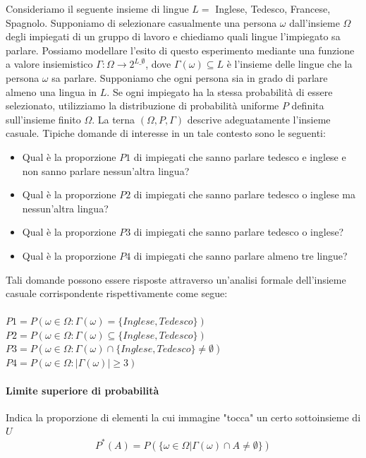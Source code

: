 Consideriamo il seguente insieme di lingue $L =$ {Inglese, Tedesco, Francese, Spagnolo}. Supponiamo di selezionare casualmente una persona $\omega$ dall'insieme $\Omega$ degli impiegati di un gruppo di lavoro e chiediamo quali lingue l'impiegato sa parlare. Possiamo modellare l'esito di questo esperimento mediante una funzione a valore insiemistico $\Gamma: \Omega \rightarrow 2^{L\_{\emptyset}}$, dove $\Gamma(\omega) \subseteq L$ è l'insieme delle lingue che la persona $\omega$ sa parlare. Supponiamo che ogni persona sia in grado di parlare almeno una lingua in $L$. Se ogni impiegato ha la stessa probabilità di essere selezionato, utilizziamo la distribuzione di probabilità uniforme $P$ definita sull'insieme finito $\Omega$. La terna $(\Omega, P, \Gamma)$ descrive adeguatamente l'insieme casuale. Tipiche domande di interesse in un tale contesto sono le seguenti:
\begin{itemize}
    \item Qual è la proporzione $P1$ di impiegati che sanno parlare tedesco e inglese e non sanno parlare nessun'altra lingua?
    \item Qual è la proporzione $P2$ di impiegati che sanno parlare tedesco o inglese ma nessun'altra lingua?
    \item Qual è la proporzione $P3$ di impiegati che sanno parlare tedesco o inglese?
    \item Qual è la proporzione $P4$ di impiegati che sanno parlare almeno tre lingue?
\end{itemize}
Tali domande possono essere risposte attraverso un'analisi formale dell'insieme casuale corrispondente rispettivamente come segue:\\\\
$P1 = P({\omega \in \Omega : \Gamma(\omega) = \{Inglese, Tedesco\}})$\\
$P2 = P({\omega \in \Omega : \Gamma(\omega) \subseteq \{Inglese, Tedesco\}})$\\
$P3 = P({\omega \in \Omega : \Gamma(\omega) \cap \{Inglese, Tedesco\} \neq \emptyset})$\\
$P4 = P({\omega \in \Omega : |\Gamma(\omega)| \geq 3})$

\paragraph{Limite superiore di probabilità}
Indica la proporzione di elementi la cui immagine "tocca" un certo sottoinsieme di $U$
$$P^*(A) = P(\{ \omega \in \Omega | \Gamma (\omega) \cap A \neq \emptyset \})$$

